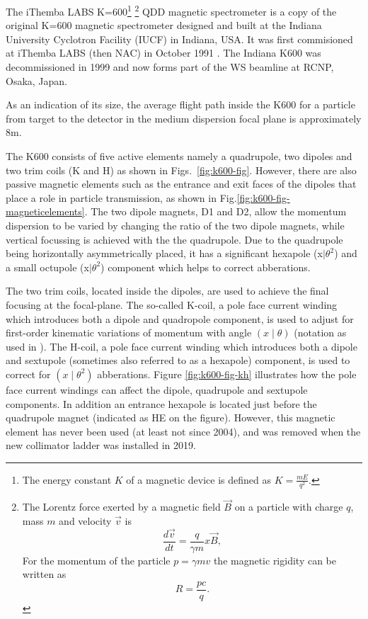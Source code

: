 \documentclass[11pt]{report}
\begin{document}
The iThemba LABS K=600\footnote{The energy constant $K$ of a magnetic device is 
defined as $K=\frac{mE}{q^2}$.} 
\footnote{The Lorentz force exerted by a magnetic field $\overrightarrow{B}$ on a 
particle with charge $q$, mass $m$ and velocity $\overrightarrow{v}$ is
\begin{equation}
   \frac{d\overrightarrow{v}}{dt} = \frac{q}{\gamma m} x \overrightarrow{B},
\end{equation}
\noindent For the momentum of the particle $p=\gamma mv$ the magnetic rigidity can be written as
\begin{equation}
R=\frac{pc}{q}.
\end{equation}
}
QDD magnetic spectrometer is a copy of the original K=600 
magnetic spectrometer designed and built at the Indiana University Cyclotron Facility (IUCF) in Indiana, USA. %
It was first commisioned at iThemba LABS (then NAC) in October 1991 \cite{AnRep91}.
The Indiana K600 was decommissioned in 1999 and now forms part of the WS beamline 
at RCNP, Osaka, Japan.

As an indication of its size, the average flight path inside the K600 for a particle from target to 
the detector in the medium dispersion focal plane is approximately 8m.

The K600 consists of five active elements namely a quadrupole, two dipoles and two trim 
coils (K and H) as shown in Figs.~\ref{fig:k600-fig}.  However, there are also 
passive magnetic elements such as the entrance and exit faces of the dipoles that
place a role in particle transmission, as shown in Fig.\ref{fig:k600-fig-magneticelements}. 
The two dipole magnets, D1 and D2, 
allow the momentum dispersion to be varied by changing the ratio of the two dipole magnets, 
while vertical focussing is achieved with the the quadrupole. 
Due to the quadrupole being horizontally asymmetrically placed, it has a
significant hexapole (x$\mid\theta^{2}$) and a small octupole
(x$\mid\theta^{2}$) component which helps to correct abberations.


The two trim coils, located inside the dipoles, are used to achieve the final focusing at 
the focal-plane. The so-called K-coil, a pole face current winding which introduces both 
a dipole and quadropole component,  is used to adjust 
for first-order kinematic variations of momentum with angle $\left( x\mid \theta\right)$ 
(notation as used in \cite{Eng81}). 
The H-coil, a pole face current winding which introduces both a dipole and sextupole 
(sometimes also referred to as a hexapole) component, 
is used to correct for $\left( x\mid \theta ^{2}\right)$ abberations. 
Figure \ref{fig:k600-fig-kh} illustrates how the pole face current windings can affect 
the dipole, quadrupole and sextupole components.
In addition an entrance hexapole is located just before the quadrupole magnet (indicated as HE on the figure). 
However, this magnetic element has never been used (at least not since 2004), and was removed when the new collimator
ladder was installed in 2019.
\end{document}
